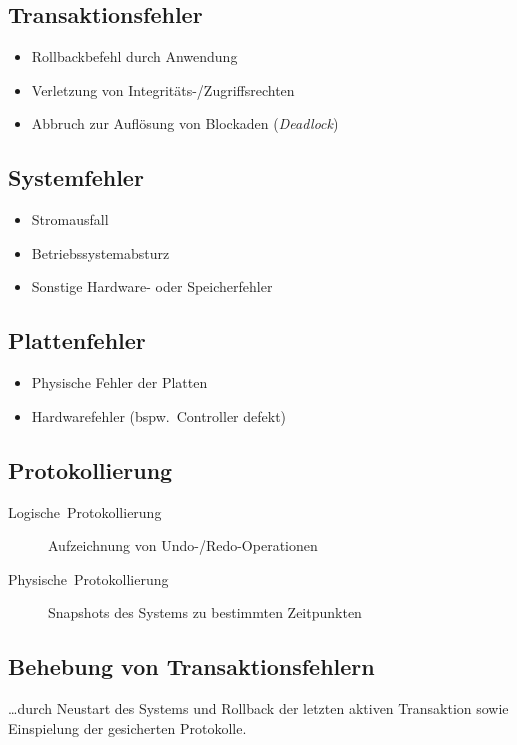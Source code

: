 \subsection{Transaktionsfehler}
\begin{itemize}
\item Rollbackbefehl durch Anwendung
\item Verletzung von Integritäts-\slash{}Zugriffsrechten
\item Abbruch zur Auflösung von Blockaden (\foreignlanguage{english}{\emph{Deadlock}})
\end{itemize}

\subsection{Systemfehler}
\begin{itemize}
\item Stromausfall
\item Betriebssystemabsturz
\item Sonstige Hardware- oder Speicherfehler
\end{itemize}

\subsection{Plattenfehler}
\begin{itemize}
\item Physische Fehler der Platten
\item Hardwarefehler (bspw.~Controller defekt)
\end{itemize}

\subsection{Protokollierung}
\begin{description}
\item [{Logische~Protokollierung}] Aufzeichnung von Undo-\slash{}Redo-Operationen
\item [{Physische~Protokollierung}] Snapshots des Systems zu bestimmten
Zeitpunkten
\end{description}

\subsection{Behebung von Transaktionsfehlern}

\ldots{}durch Neustart des Systems und Rollback der letzten aktiven
Transaktion sowie Einspielung der gesicherten Protokolle.


